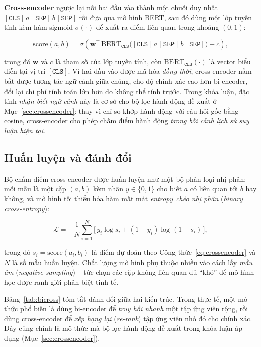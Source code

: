 \textbf{Cross-encoder} ngược lại nối hai đầu vào thành một chuỗi duy nhất
$[\mathtt{CLS}]\,a\,[\mathtt{SEP}]\,b\,[\mathtt{SEP}]$ rồi đưa qua mô hình BERT, sau đó dùng một
lớp tuyến tính kèm hàm sigmoid $\sigma(\cdot)$ để xuất ra điểm liên quan trong khoảng $(0, 1)$:

\begin{equation}
\label{eq:crossencoder}
\mathrm{score}(a, b) = \sigma\!\left(\mathbf{w}^{\top}\,
\mathrm{BERT}_{\mathtt{CLS}}\big([\mathtt{CLS}]\,a\,[\mathtt{SEP}]\,b\,[\mathtt{SEP}]\big) + c\right),
\end{equation}

trong đó $\mathbf{w}$ và $c$ là tham số của lớp tuyến tính, còn
$\mathrm{BERT}_{\mathtt{CLS}}(\cdot)$ là vector biểu diễn tại vị trí $[\mathtt{CLS}]$. Vì hai đầu
vào được mã hóa \emph{đồng thời}, cross-encoder nắm bắt được tương tác ngữ cảnh giữa chúng, cho độ
chính xác cao hơn bi-encoder, đổi lại chi phí tính toán lớn hơn do không thể tính trước. Trong khóa
luận, đặc tính \emph{nhận biết ngữ cảnh} này là cơ sở cho bộ lọc hành động đề xuất ở
Mục~\ref{sec:crossencoder}: thay vì chỉ so khớp hành động với câu hỏi gốc bằng cosine, cross-encoder
cho phép chấm điểm hành động \emph{trong bối cảnh lịch sử suy luận hiện tại}.

\subsection{Huấn luyện và đánh đổi}

Bộ chấm điểm cross-encoder được huấn luyện như một bộ phân loại nhị phân: mỗi mẫu là một cặp
$(a, b)$ kèm nhãn $y \in \{0, 1\}$ cho biết $a$ có liên quan tới $b$ hay không, và mô hình tối
thiểu hóa hàm mất mát \textit{entropy chéo nhị phân} (\textit{binary cross-entropy}):

\begin{equation}
\label{eq:bce}
\mathcal{L} = -\frac{1}{N} \sum_{i=1}^{N}
\Big[\, y_i \log s_i + (1 - y_i) \log (1 - s_i) \,\Big],
\end{equation}

trong đó $s_i = \mathrm{score}(a_i, b_i)$ là điểm dự đoán theo Công thức~\eqref{eq:crossencoder} và
$N$ là số mẫu huấn luyện. Chất lượng mô hình phụ thuộc nhiều vào cách lấy \textit{mẫu âm}
(\textit{negative sampling}) -- tức chọn các cặp không liên quan đủ ``khó'' để mô hình học được
ranh giới phân biệt tinh tế.

Bảng~\ref{tab:bicross} tóm tắt đánh đổi giữa hai kiến trúc. Trong thực tế, một mô thức phổ biến là
dùng bi-encoder để \emph{truy hồi nhanh} một tập ứng viên rộng, rồi dùng cross-encoder để
\emph{xếp hạng lại} (\textit{re-rank}) tập ứng viên nhỏ đó cho chính xác. Đây cũng chính là mô thức
mà bộ lọc hành động đề xuất trong khóa luận áp dụng (Mục~\ref{sec:crossencoder}).

